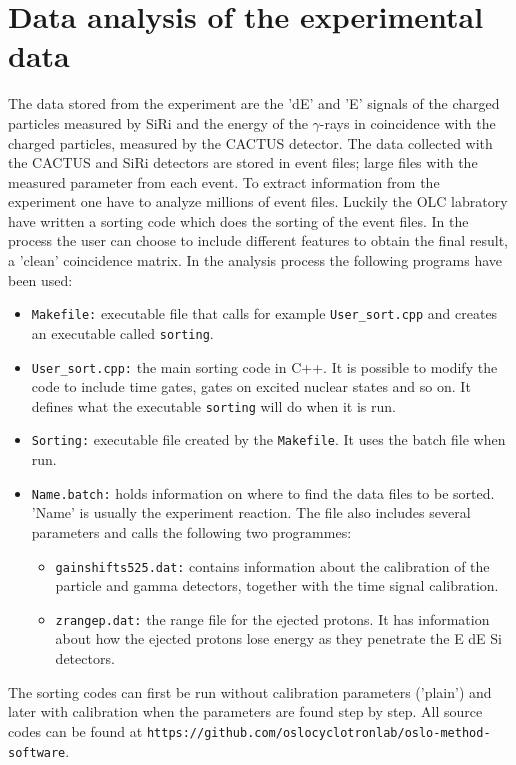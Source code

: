 \documentclass[11pt,a4wide]{article}
\begin{document}


\section{Data analysis of the experimental data}
The data stored from the experiment are the 'dE' and 'E' signals of the charged particles measured by SiRi and the energy of the $\gamma$-rays in coincidence with the charged particles, measured by the CACTUS detector. The data collected with the CACTUS and SiRi detectors are stored in event files; large files with the measured parameter from each event. To extract information from the experiment one have to analyze millions of event files. Luckily the OLC labratory have written a sorting code which does the sorting of the event files. In the process the user can choose to include different features to obtain the final result, a 'clean' coincidence matrix. In the analysis process the following programs have been used:
\begin{itemize}
\item \texttt{Makefile:} executable file that calls for example \texttt{User\_sort.cpp} and creates an executable called \texttt{sorting}.
\item \texttt{User\_sort.cpp:} the main sorting code in C++. It is possible to modify the code to include time gates, gates on excited nuclear states and so on. It defines what the executable \texttt{sorting} will do when it is run. 
\item \texttt{Sorting:} executable file created by the \texttt{Makefile}. It uses the batch file when run.
\item \texttt{Name.batch:} holds information on where to find the data files to be sorted. 'Name' is usually the experiment reaction. The file also includes several parameters and calls the following two programmes:
\begin{itemize}
\item \texttt{gainshifts525.dat:} contains information about the calibration of the particle and gamma detectors, together with the time signal calibration.
\item \texttt{zrangep.dat:} the range file for the ejected protons. It has information about how the ejected protons lose energy as they penetrate the E dE Si detectors.
\end{itemize}
\end{itemize}
The sorting codes can first be run without calibration parameters ('plain') and later with calibration when the parameters are found step by step. All source codes can be found at \texttt{https://github.com/oslocyclotronlab/oslo-method-software}.
\end{document}
